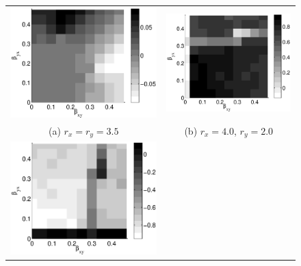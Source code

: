 \documentclass[a4paper,11pt,twocolumn]{article}
\begin{document}
\begin{figure}[ht]
\begin{tabular}{cc}
\includegraphics[scale=0.30]{CoupLogexample_rx35ry35.eps} &
\includegraphics[scale=0.30]{CoupLogexample_rx40ry20.eps} \\
(a) $r_x = r_y = 3.5$ & (b) $r_x = 4.0$, $r_y = 2.0$ \\
\includegraphics[scale=0.30]{CoupLogexample_rx20ry40.eps} &

\end{tabular}
\end{figure}
\end{document}
